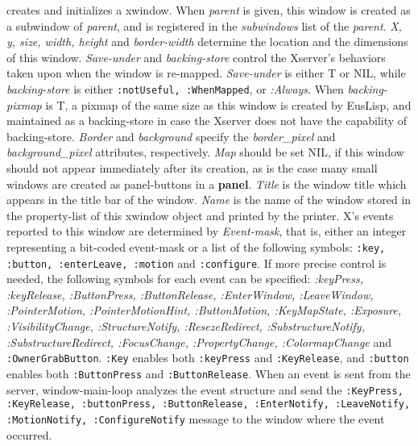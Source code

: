 \begin{refdesc}
{creates and initializes a xwindow.
When {\em parent} is given, this window is created as a subwindow
of {\em parent}, and is registered in the {\em subwindows} list of
the {\em parent}.
{\em X, y, size, width, height} and {\em border-width} determine
the location and the dimensions of this window.
{\em Save-under} and {\em backing-store} control the Xserver's behaviors
taken upon when the window is re-mapped. {\em Save-under} is either
T or NIL, while {\em backing-store} is either {\tt :notUseful, :WhenMapped},
or {\em :Always}.
When {\em backing-pixmap} is T, a pixmap of the same size as this window
is created by EusLisp, and maintained as a backing-store in case
the Xserver does not have the capability of backing-store.
{\em Border} and {\em background} specify the {\em border\_pixel}
and {\em background\_pixel} attributes, respectively.
{\em Map} should be set NIL, if this window should not appear
immediately after its creation, as is the case many small windows 
are created as panel-buttons in a {\bf panel}.
{\em Title} is the window title which appears in the title bar of 
the window.
{\em Name} is the name of the window stored in the property-list
of this xwindow object and printed by the printer.
X's events reported to this window are determined by 
{\em Event-mask}, that is, either an integer representing a bit-coded event-mask
or a list of the following symbols:
{\tt :key, :button, :enterLeave, :motion} and {\tt :configure}.
If more precise control is needed, the following symbols for each event
can be specified: {\em :keyPress, :keyRelease, :ButtonPress, :ButtonRelease,
:EnterWindow, :LeaveWindow, :PointerMotion, :PointerMotionHint, 
:ButtonMotion, :KeyMapState, :Exposure, :VisibilityChange, :StructureNotify,
:ResezeRedirect, :SubstructureNotify, :SubstructureRedirect,
:FocusChange, :PropertyChange, :ColormapChange} and {\tt :OwnerGrabButton}.
{\tt :Key} enables both {\tt :keyPress} and {\tt :KeyRelease}, and
{\tt :button} enables both {\tt :ButtonPress} and {\tt :ButtonRelease}.
When an event is sent from the server, {\bfx window-main-loop} analyzes
the event structure and send the {\tt :KeyPress, :KeyRelease, :buttonPress,
:ButtonRelease, :EnterNotify, :LeaveNotify, :MotionNotify, :ConfigureNotify}
message to the window where the event occurred.}


\end{refdesc}

